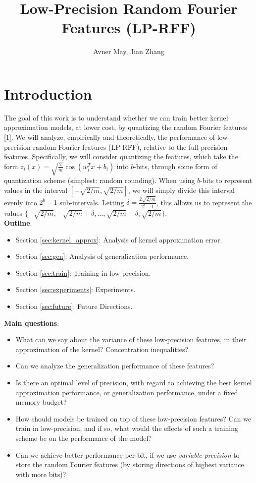 \documentclass[12pt]{article}
\begin{document}
\title{Low-Precision Random Fourier Features (LP-RFF)}
\author{Avner May, Jian Zhang}
\onehalfspacing
\maketitle

\section{Introduction}
\label{sec:intro}
The goal of this work is to understand whether we can train better kernel approximation models, at lower cost,
by quantizing the random Fourier features [1].  We will analyze, empirically and theoretically, the performance of low-precision random Fourier features (LP-RFF), relative to the full-precision features.  Specifically, we will consider quantizing the features, which take the form $z_i(x) = \sqrt{\frac{2}{m}} \cos(w_i^Tx+b_i)$ into $b$-bits, through some form of quantization scheme (simplest: random rounding). 
When using $b$-bits to represent values in the interval $[-\sqrt{2/m},\sqrt{2/m}]$, we will simply divide this interval evenly into $2^b-1$ sub-intervals.  Letting $\delta = \frac{2\sqrt{2/m}}{2^b-1}$, this allows us to represent the values $\{-\sqrt{2/m},-\sqrt{2/m} + \delta,\ldots,\sqrt{2/m}-\delta, \sqrt{2/m}\}$. \\

\noindent \textbf{Outline}:
\begin{itemize}
	\item Section \ref{sec:kernel_approx}: Analysis of kernel approximation error.
	\item Section \ref{sec:gen}: Analysis of generalization performance.
	\item Section \ref{sec:train}: Training in low-precision.
	\item Section \ref{sec:experiments}: Experiments.
	\item Section \ref{sec:future}: Future Directions.
\end{itemize}

\noindent \textbf{Main questions}:
\begin{itemize}
	\item What can we say about the variance of these low-precision features, in their approximation of the kernel?  Concentration inequalities?
	\item Can we analyze the generalization performance of these features?
	\item Is there an optimal level of precision, with regard to achieving the best kernel approximation performance, or generalization performance, under a fixed memory budget?
	\item How should models be trained on top of these low-precision features? Can we train in low-precision, and if so, what would the effects of such a training scheme be on the performance of the model?
	\item Can we achieve better performance per bit, if we use \textit{variable precision} to store the random Fourier features (by storing directions of highest variance with more bits)?
\end{itemize}
\end{document}
